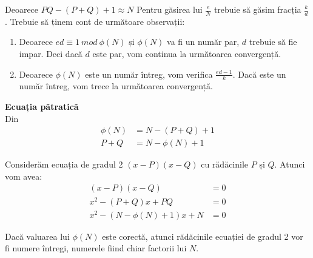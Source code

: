 \documentclass[12pt, oneside]{book}
\begin{document}
Deoarece $PQ - (P+Q)+1 \approx N$
Pentru găsirea lui $\frac{e}{N}$ trebuie să găsim fracția $\frac{k}{d}$. Trebuie să ținem cont de următoare observații:
\begin{enumerate}
\item Deoarece $ed \equiv 1 \ mod \ \phi(N)$ și $\phi(N)$ va fi un număr par, $d$ trebuie să fie impar. Deci dacă $d$ este par, vom continua la următoarea convergență.

\item Deoarece $\phi(N)$ este un număr întreg, vom verifica  $\frac{ed -1}{k}$. Dacă este un număr întreg, vom trece la următoarea convergență.

\end{enumerate}
\textbf{Ecuația pătratică} \\
Din
\begin{align*}
 \phi(N)&=N-(P+Q)+1 \\
 P+Q &= N - \phi(N) +1 
\end{align*}

Considerăm ecuația de gradul 2 $(x-P)(x-Q)$ cu rădăcinile $P$ și $Q$. Atunci vom avea:
\begin{align*}
(x-P)(x-Q)&=0\\
x^2 - (P+Q)x + PQ &= 0\\
x^2 - (N- \phi(N)+1)x + N &=0
\end{align*}

Dacă valuarea lui $\phi(N)$ este corectă, atunci rădăcinile ecuației de gradul 2 vor fi numere întregi, numerele fiind chiar factorii lui $N$. \\
\end{document}
